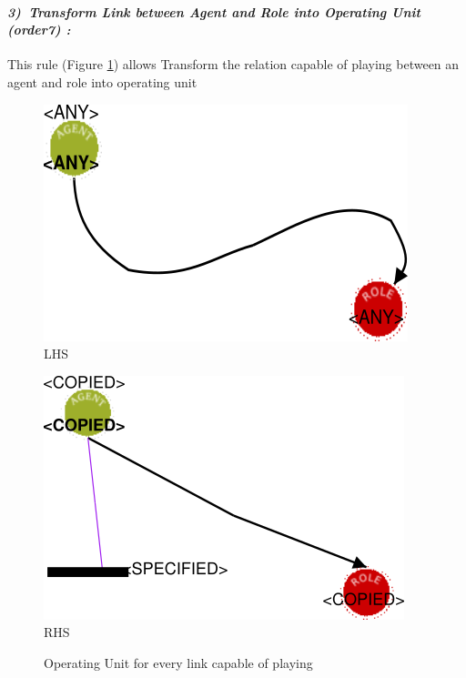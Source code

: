 \paragraph{\emph{3)~Transform Link between Agent and Role into Operating Unit (order7) :} }
 
 
This rule (Figure \ref{fig:Operating Unit for every link capable of playing}) allows Transform 
the relation capable of playing between an agent and role  into operating unit
\vspace{1cm}
\begin{figure}[th]
\centering
\begin{minipage}{.5\textwidth}
  \begin{center}
  \includegraphics[width=.8\linewidth]{chapiter3/img/L3}
  LHS
  \end{center}
  
\end{minipage}%
\begin{minipage}{.5\textwidth}
  \begin{center}
  \includegraphics[width=.8\linewidth]{chapiter3/img/R3}
  RHS 
  \end{center}
\end{minipage}
\caption{\label{fig:Operating Unit for every link capable of playing}Operating Unit for every link capable of playing} 
\end{figure}


